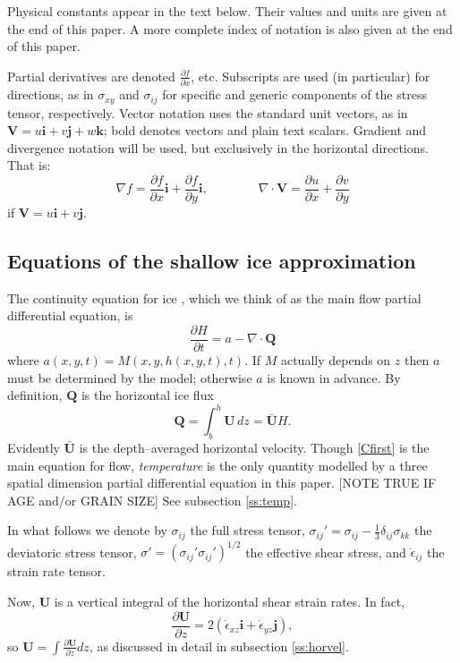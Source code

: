 \documentclass{amsart}%
\theoremstyle{plain}
\theoremstyle{definition}
\theoremstyle{remark}
\newcommand{\ddt}[1]{\ensuremath{\frac{\partial #1}{\partial t}}}
\newcommand{\ddx}[1]{\ensuremath{\frac{\partial #1}{\partial x}}}
\newcommand{\ddy}[1]{\ensuremath{\frac{\partial #1}{\partial y}}}
\newcommand{\ddz}[1]{\ensuremath{\frac{\partial #1}{\partial z}}}
\newcommand{\diverg}{\nabla\cdot}
\def\eps{\epsilon}
\newcommand{\grad}{\nabla}
\newcommand{\ihat}{\mathbf{i}}
\newcommand{\jhat}{\mathbf{j}}
\newcommand{\khat}{\mathbf{k}}
\newcommand{\bQ}{{\mathbf{Q}}}
\newcommand{\bU}{{\mathbf{U}}}
\newcommand{\bV}{{\mathbf{V}}}
\begin{document}
Physical constants appear in the text below.  Their values and units are given at the end of this paper.  A more complete index of notation is also given at the end of this paper.

Partial derivatives are denoted $\frac{\partial f}{\partial x}$, etc.  Subscripts are used (in particular) for directions, as in $\sigma_{xy}$ and $\sigma_{ij}$ for specific and generic components of the stress tensor, respectively.  Vector notation uses the standard unit vectors, as in $\bV=u\ihat+v\jhat+w\khat$; bold denotes vectors and plain text scalars.  Gradient and divergence notation will be used, but exclusively in the horizontal directions.  That is:
    $$\grad f = \ddx{f} \ihat + \ddy{f} \ihat, \qquad \qquad \diverg \bV = \ddx{u} + \ddy{v}$$
if $\bV=u\ihat+v\jhat$.


\subsection{Equations of the shallow ice approximation}  The continuity equation for ice \cite{Paterson}, which we think of as the main flow partial differential equation, is
\begin{equation}\label{Cfirst}
\ddt{H} = a - \diverg \bQ
\end{equation}
where $a(x,y,t)=M(x,y,h(x,y,t),t)$.  If $M$ actually depends on $z$ then $a$ must be determined by the model; otherwise $a$ is known in advance.  By definition, $\bQ$ is the horizontal ice flux
\begin{equation}\label{flux}
\bQ = \int_{b}^h \bU\,dz = \bar \bU H.
\end{equation}
Evidently $\bar \bU$ is the depth--averaged horizontal velocity.  Though \eqref{Cfirst} is the main equation for flow, \emph{temperature} is the only quantity modelled by a three spatial dimension partial differential equation in this paper.  [NOTE TRUE IF AGE and/or GRAIN SIZE]  See subsection \ref{ss:temp}.

In what follows we denote by $\sigma_{ij}$ the full stress tensor, $\sigma_{ij}'= \sigma_{ij}- \frac{1}{3} \delta_{ij} \sigma_{kk}$ the deviatoric stress tensor, $\sigma'= \left(\sigma_{ij}' \sigma_{ij}'\right)^{1/2}$  the effective shear stress, and $\dot \eps_{ij}$ the strain rate tensor.

Now, $\bU$ is a vertical integral of the horizontal shear strain rates.  In fact,
\begin{equation}\label{stressstrain}
\ddz{\bU} = 2(\dot\eps_{xz}\ihat+\dot\eps_{yz}\jhat),
\end{equation}
so $\bU=\int \ddz{\bU} dz$, as discussed in detail in subsection \ref{ss:horvel}.
\end{document}
